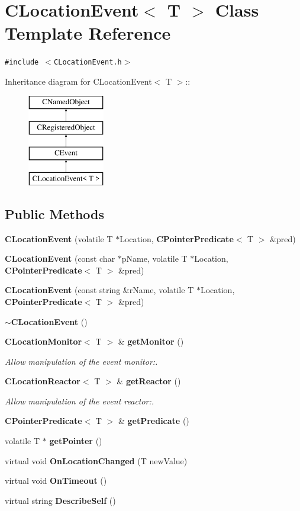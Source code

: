 \section{CLocation\-Event$<$ T $>$  Class Template Reference}
\label{classCLocationEvent}
{\tt \#include $<$CLocation\-Event.h$>$}

Inheritance diagram for CLocation\-Event$<$ T $>$::\begin{figure}[H]
\begin{center}
\leavevmode
\includegraphics[height=4cm]{classCLocationEvent}
\end{center}
\end{figure}
\subsection*{Public Methods}
\begin{CompactItemize}
\item 
{\bf CLocation\-Event} (volatile T $\ast$Location, {\bf CPointer\-Predicate}$<$ T $>$ \&pred)
\item 
{\bf CLocation\-Event} (const char $\ast$p\-Name, volatile T $\ast$Location, {\bf CPointer\-Predicate}$<$ T $>$ \&pred)
\item 
{\bf CLocation\-Event} (const string \&r\-Name, volatile T $\ast$Location, {\bf CPointer\-Predicate}$<$ T $>$ \&pred)
\item 
{\bf $\sim$CLocation\-Event} ()
\item 
{\bf CLocation\-Monitor}$<$ T $>$ \& {\bf get\-Monitor} ()
\begin{CompactList}\small\item\em Allow manipulation of the event monitor:.\item\end{CompactList}\item 
{\bf CLocation\-Reactor}$<$ T $>$ \& {\bf get\-Reactor} ()
\begin{CompactList}\small\item\em Allow manipulation of the event reactor:.\item\end{CompactList}\item 
{\bf CPointer\-Predicate}$<$ T $>$ \& {\bf get\-Predicate} ()
\item 
volatile T $\ast$ {\bf get\-Pointer} ()
\item 
virtual void {\bf On\-Location\-Changed} (T new\-Value)
\item 
virtual void {\bf On\-Timeout} ()
\item 
virtual string {\bf Describe\-Self} ()
\end{CompactItemize}
